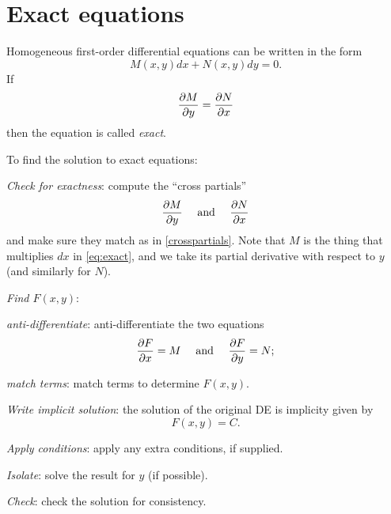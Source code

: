 \documentclass{book}
\begin{document}


\newpage
\section{Exact equations}

Homogeneous first-order differential equations can be written in the form
\begin{equation}
  \label{eq:exact}
  M(x,y) dx + N(x,y) dy = 0.
\end{equation}
If
\begin{equation}
  \label{crosspartials}
  \frac{\partial M}{\partial y} = \frac{\partial N}{\partial x}
\end{equation}
then the equation is called \emph{exact}.

To find the solution to exact equations:
\begin{enumerate*}
\item \emph{Check for exactness}: compute the ``cross partials''
  \begin{equation*}
    \frac{\partial M}{\partial y} \quad \text{ and } \quad \frac{\partial N}{\partial x}
  \end{equation*}
  and make sure they match as in \eqref{crosspartials}.  Note that $M$
  is the thing that multiplies $dx$ in \eqref{eq:exact}, and we take
  its partial derivative with respect to $y$ (and similarly for $N$).
\item \emph{Find $F(x,y)$}:
  \begin{enumerate*}
  \item \emph{anti-differentiate}: anti-differentiate the two equations
    \begin{equation*}
      \frac{\partial F}{\partial x} = M \quad \text{ and } \quad \frac{\partial F}{\partial y} = N;
    \end{equation*}
  \item \emph{match terms}: match terms to determine $F(x,y)$.
  \end{enumerate*}
\item \emph{Write implicit solution}: the solution of the original DE is implicity given by
  \begin{equation*}
    F(x,y) = C.
  \end{equation*}
\item \emph{Apply conditions}: apply any extra conditions, if supplied.
\item \emph{Isolate}: solve the result for $y$ (if possible).
\item \emph{Check}: check the solution for consistency.
\end{enumerate*}
\end{document}
